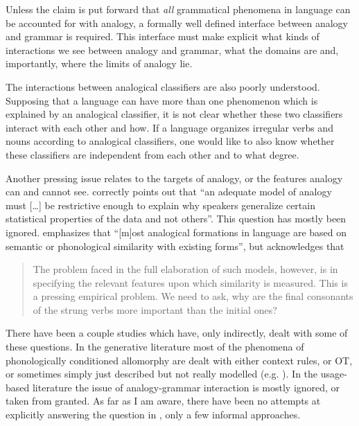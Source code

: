 Unless the claim is put forward that \textit{all} grammatical phenomena in language can be accounted for with analogy, a formally well defined interface between analogy and grammar is required. This interface must make explicit what kinds of interactions we see between analogy and grammar, what the domains are and, importantly, where the limits of analogy lie.

The interactions between analogical classifiers are also poorly understood. Supposing that a language can have more than one phenomenon which is explained by an analogical classifier, it is not clear whether these two classifiers interact with each other and how. If a language organizes irregular verbs and nouns according to analogical classifiers, one would like to also know whether these classifiers are independent from each other and to what degree.

Another pressing issue relates to the targets of analogy, or the features analogy can and cannot see. \textcite[185]{Albright.2009} correctly points out that ``an adequate model of analogy must [\dots] be restrictive enough to explain why speakers generalize certain statistical properties of the data and not others''. This question has mostly been ignored. \textcite[54]{Bybee.2010} emphasizes that ``[m]ost analogical formations in language are based on semantic or phonological similarity with existing forms'', but acknowledges that

\begin{quotation}
  The problem faced in the full elaboration of such models, however, is in specifying the relevant features upon which similarity is measured.
  This is a pressing empirical problem. We need to ask, why are the final consonants of the strung verbs more important than the initial ones? \autocite[62]{Bybee.2010}
\end{quotation}

There have been a couple studies which have, only indirectly, dealt with some of these questions. In the generative literature most of the phenomena of phonologically conditioned allomorphy are dealt with either context rules, or OT, or sometimes simply just described but not really modelled (e.g. \citealt[119]{Rubach.2007}). In the usage-based literature the issue of analogy-grammar interaction is mostly ignored, or taken from granted. As far as I am aware, there have been no attempts at explicitly answering the question in , only a few informal approaches.

